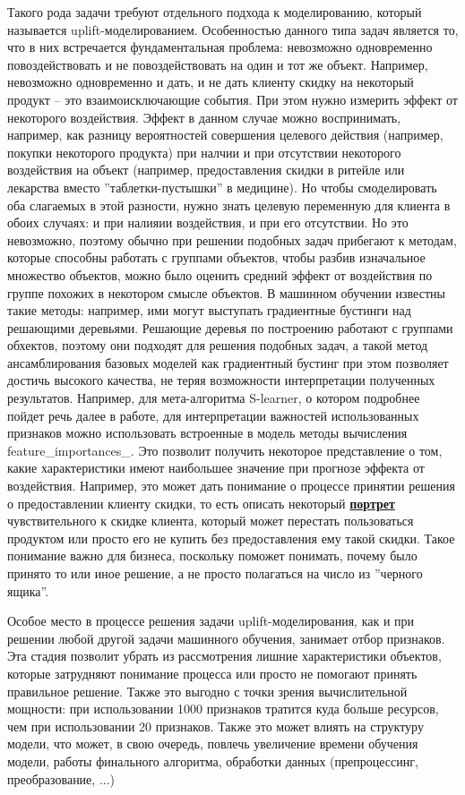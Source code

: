 \par
Такого рода задачи требуют отдельного подхода к моделированию, который называется uplift-моделированием. Особенностью данного типа задач является то, что в них встречается фундаментальная проблема: невозможно одновременно повоздействовать и не повоздействовать на один и тот же объект. Например, невозможно одновременно и дать, и не дать клиенту скидку на некоторый продукт -- это взаимоисключающие события. При этом нужно измерить эффект от некоторого воздействия. Эффект в данном случае можно воспринимать, например, как разницу вероятностей совершения целевого действия (например, покупки некоторого продукта) при налчии и при отсутствии некоторого воздействия на объект (например, предоставления скидки в ритейле или лекарства вместо ''таблетки-пустышки'' в медицине). Но чтобы смоделировать оба слагаемых в этой разности, нужно знать целевую переменную для клиента в обоих случаях: и при налияии воздействия, и при его отсутствии. Но это невозможно, поэтому обычно при решении подобных задач прибегают к методам, которые способны работать с группами объектов, чтобы разбив изначальное множество объектов, можно было оценить средний эффект от воздействия по группе похожих в некотором смысле объектов. В машинном обучении известны такие методы: например, ими могут выступать градиентные бустинги над решающими деревьями. Решающие деревья по построению работают с группами обхектов, поэтому они подходят для решения подобных задач, а такой метод ансамблирования базовых моделей как градиентный бустинг при этом позволяет достичь высокого качества, не теряя возможности интерпретации полученных результатов. Например, для мета-алгоритма S-learner, о котором подробнее пойдет речь далее в работе, для интерпретации важностей использованных признаков можно использовать встроенные в модель методы вычисления feature\_importances\_. Это позволит получить некоторое представление о том, какие характеристики имеют наибольшее значение при прогнозе эффекта от воздействия. Например, это может дать понимание о процессе принятии решения о предоставлении клиенту скидки, то есть описать некоторый \textbf{\underline{портрет}} чувствительного к скидке клиента, который может перестать пользоваться продуктом или просто его не купить без предоставления ему такой скидки. Такое понимание важно для бизнеса, поскольку поможет понимать, почему было принято то или иное решение, а не просто полагаться на число из ''черного ящика''.

\par
Особое место в процессе решения задачи uplift-моделирования, как и при решении любой другой задачи машинного обучения, занимает отбор признаков. Эта стадия позволит убрать из рассмотрения лишние характеристики объектов, которые затрудняют понимание процесса или просто не помогают принять правильное решение. Также это выгодно с точки зрения вычислительной мощности: при использовании 1000 признаков тратится куда больше ресурсов, чем при использовании 20 признаков. Также это может влиять на структуру модели, что может, в свою очередь, повлечь увеличение времени обучения модели, работы финального алгоритма, обработки данных (препроцессинг, преобразование, ...)





